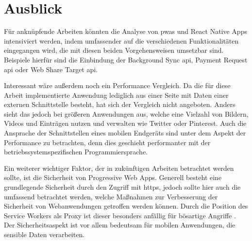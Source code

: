 
\section{Ausblick}
Für anknüpfende Arbeiten könnten die Analyse von \acp{pwa} und React Native Apps intensiviert werden, indem umfassender auf die verschiedenen Funktionalitäten eingegangen wird, die mit diesen beiden Vorgehensweisen umsetzbar sind.
Beispiele hierfür sind die Einbindung der Background Sync \ac{api}, Payment Request \ac{api} oder Web Share Target \ac{api}.

Interessant wäre außerdem noch ein Performance Vergleich.
Da die für diese Arbeit implementierte Anwendung lediglich aus einer Seite mit Daten einer externen Schnittstelle besteht, hat sich der Vergleich nicht angeboten.
Anders sieht das jedoch bei größeren Anwendungen aus, welche eine Vielzahl von Bildern, Videos und Einträgen nutzen und verwalten wie Twitter oder Pinterest.
Auch die Ansprache der Schnittstellen eines mobilen Endgeräts sind unter dem Aspekt der Performance zu betrachten, denn dies geschieht performanter mit der betriebssystemspezifischen Programmiersprache.

Ein weiterer wichtiger Faktor, der in zukünftigen Arbeiten betrachtet werden sollte, ist die Sicherheit von Progressive Web Apps.
Generell besteht eine grundlegende Sicherheit durch den Zugriff mit \ac{https}, jedoch sollte hier auch die umfassend betrachtet werden, welche Maßnahmen zur Verbesserung der Sicherheit von Webanwendungen getroffen werden können.
Durch die Position des Service Workers als Proxy ist dieser besonders anfällig für bösartige Angriffe \cite{Lee.2018}.
Der Sicherheitsaspekt ist vor allem bedeutsam für mobilen Anwendungen, die sensible Daten verarbeiten.